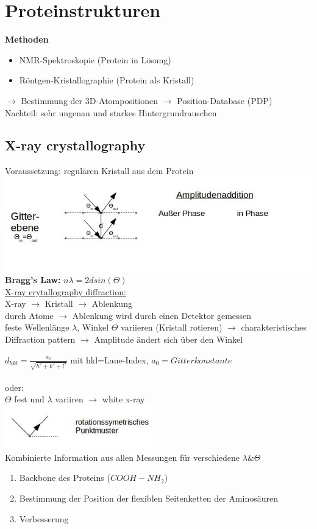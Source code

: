 \section{Proteinstrukturen}
\textbf{Methoden}
\begin{itemize}
\item NMR-Spektroskopie (Protein in Lösung)
\item Röntgen-Kristallographie (Protein als Kristall)
\end{itemize}
$\rightarrow$ Bestimmung der 3D-Atompositionen $\rightarrow$ Position-Database (PDP)\\

Nachteil: sehr ungenau und starkes Hintergrundrauschen

\subsection{X-ray crystallography}
Voraussetzung: regulären Kristall aus dem Protein\\
\includegraphics[width=1\textwidth]{lectures/160603/pix/1.jpg}
\textbf{Bragg's Law:} $n\lambda=2dsin(\Theta)$\\

\underline{X-ray crytallography diffraction:}\\
X-ray $\rightarrow$ Kristall $\rightarrow$ Ablenkung\\
durch Atome $\rightarrow$ Ablenkung wird durch einen Detektor gemessen\\
feste Wellenlänge $\lambda$, Winkel $\Theta$ variieren (Kristall rotieren) $\rightarrow$ charakteristisches Diffraction pattern $\rightarrow$ Amplitude ändert sich über den Winkel

$d_{hkl}=\frac{a_{0}}{\sqrt{h^2+k^2+l^2}}$ mit hkl=Laue-Index, $a_0=Gitterkonstante$
\\\\
oder:\\
$\Theta$ fest und $\lambda$ variiren $\rightarrow$ white x-ray\\
\includegraphics[width=0.5\textwidth]{lectures/160603/pix/2.jpg}
\\
Kombinierte Information aus allen Messungen für verschiedene $\lambda \& \Theta$
\\
\begin{enumerate}
	\item Backbone des Proteins ($COOH-NH_2$)
	\item Bestimmung der Position der flexiblen Seitenketten der Aminosäuren
	\item Verbesserung
\end{enumerate}

